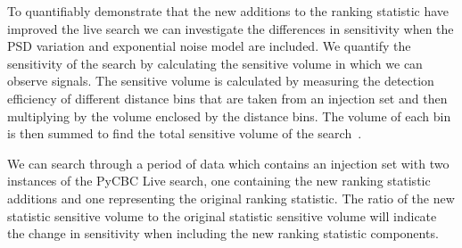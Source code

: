 To quantifiably demonstrate that the new additions to the ranking statistic have improved the live search we can investigate the differences in sensitivity when the PSD variation and exponential noise model are included. We quantify the sensitivity of the search by calculating the sensitive volume in which we can observe \gwadj signals. The sensitive volume is calculated by measuring the detection efficiency of different distance bins that are taken from an injection set and then multiplying by the volume enclosed by the distance bins. The volume of each bin is then summed to find the total sensitive volume of the search~\cite{rw_snr_eq:2012}.

We can search through a period of data which contains an injection set with two instances of the PyCBC Live search, one containing the new ranking statistic additions and one representing the original ranking statistic. The ratio of the new statistic sensitive volume to the original statistic sensitive volume will indicate the change in sensitivity when including the new ranking statistic components.

